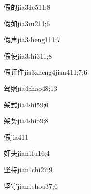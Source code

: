 \begin{verbete}{假的}{jia3de5}{11;8}
\end{verbete}

\begin{verbete}{假如}{jia3ru2}{11;6}
\end{verbete}

\begin{verbete}{假声}{jia3sheng1}{11;7}
\end{verbete}

\begin{verbete}{假使}{jia3shi3}{11;8}
\end{verbete}

\begin{verbete}{假证件}{jia3zheng4jian4}{11;7;6}
\end{verbete}

\begin{verbete}{驾照}{jia4zhao4}{8;13}
\end{verbete}

\begin{verbete}{架式}{jia4shi5}{9;6}
\end{verbete}

\begin{verbete}{架势}{jia4shi5}{9;8}
\end{verbete}

\begin{verbete}{假}{jia4}{11}
\end{verbete}

\begin{verbete}{奸夫}{jian1fu1}{6;4}
\end{verbete}

\begin{verbete}{坚持}{jian1chi2}{7;9}
\end{verbete}

\begin{verbete}{坚守}{jian1shou3}{7;6}
\end{verbete}

